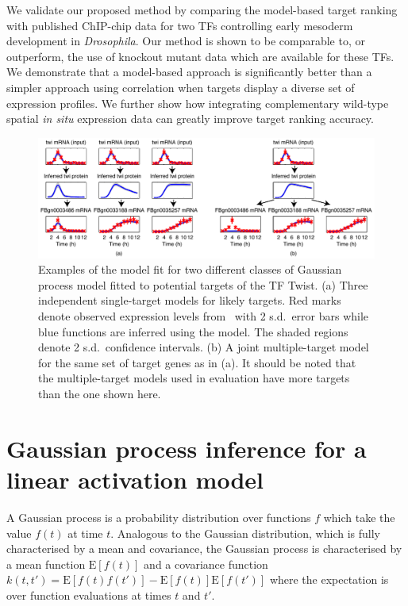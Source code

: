 \documentclass{pnastwo}
\begin{document}
\begin{article}
We validate our proposed method by comparing the model-based target
ranking with published ChIP-chip data for two TFs controlling early
mesoderm development in \emph{Drosophila}. Our method is shown to be comparable
to, or outperform, the use of knockout mutant data which are available
for these TFs. We demonstrate that a model-based approach is significantly
better than a simpler approach using correlation when targets display a diverse set of expression profiles. We further show how integrating complementary wild-type spatial
{\em in situ} expression data can greatly improve target ranking accuracy. 

\begin{figure}[tb]
  \centering
  \includegraphics{dros_gpdisim_models}
  \caption{Examples of the model fit for two different classes of 
    Gaussian process model fitted to potential targets of the TF Twist. (a) Three independent single-target models
    for likely targets. Red marks denote observed expression
    levels from~\cite{Tomancak2002} with 2 s.d.\ error bars while blue functions are inferred
    using the model.  The shaded regions denote 2 s.d.\ confidence
    intervals. (b) A joint multiple-target model for
    the same set of target genes as in (a). It should be noted that
    the multiple-target models used in evaluation have more targets
    than the one shown here.\label{fig:gpdisim_models}
}
\end{figure}

\section{Gaussian process inference for a linear activation model}

A Gaussian process is a probability distribution over
functions $f$ which take the value $f(t)$ at time
$t$. Analogous to the Gaussian distribution, which is fully
characterised by a mean and covariance, the Gaussian process is
characterised by a mean function $\mathrm{E}[f(t)]$ and a covariance
function $k(t,t')=\mathrm{E}[f(t)f(t')]-\mathrm{E}[f(t)]\mathrm{E}[f(t')]$
where the expectation is over function evaluations at times $t$ and
$t'$. 


\end{article}
\end{document}
